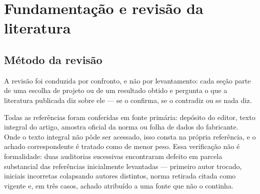
\makeatletter
{}
\makeatother

\chapter{Fundamentação e revisão da literatura}
\label{cap:revisao}

\section{Método da revisão}
\label{sec:rev-metodo}

A revisão foi conduzida por confronto, e não por levantamento: cada seção parte de uma
escolha de projeto ou de um resultado obtido e pergunta o que a literatura publicada diz
sobre ele --- se o confirma, se o contradiz ou se nada diz.

Todas as referências foram conferidas em fonte primária: depósito do editor, texto integral
do artigo, amostra oficial da norma ou folha de dados do fabricante. Onde o texto integral
não pôde ser acessado, isso consta na própria referência, e o achado correspondente é
tratado como de menor peso. Essa verificação não é formalidade: duas auditorias sucessivas
encontraram defeito em parcela substancial das referências inicialmente levantadas ---
primeiro autor trocado, iniciais incorretas colapsando autores distintos, norma retirada
citada como vigente e, em três casos, achado atribuído a uma fonte que não o continha.

